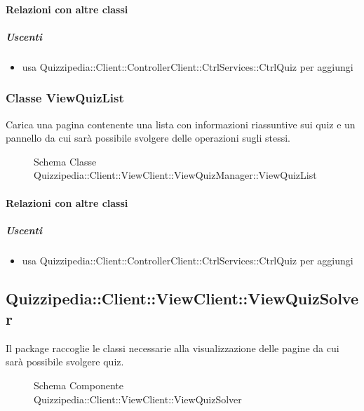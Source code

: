 \paragraph{Relazioni con altre classi}
\subparagraph{Uscenti}
\begin{itemize}
\item usa Quizzipedia::Client::ControllerClient::CtrlServices::CtrlQuiz per aggiungi
\end{itemize}
\subsubsection{Classe ViewQuizList}
Carica una pagina contenente una lista con informazioni riassuntive sui quiz e un pannello da cui sarà possibile svolgere delle operazioni sugli stessi.
\begin{figure}[H]
\centering
\noindent{}
\caption[Schema Classe ViewQuizList]{Schema Classe Quizzipedia::Client::ViewClient::ViewQuizManager::ViewQuizList}
\end{figure}
\paragraph{Relazioni con altre classi}
\subparagraph{Uscenti}
\begin{itemize}
\item usa Quizzipedia::Client::ControllerClient::CtrlServices::CtrlQuiz per aggiungi
\end{itemize}
\subsection{Quizzipedia::Client::ViewClient::ViewQuizSolver}
Il package raccoglie le classi necessarie alla visualizzazione delle pagine da cui sarà possibile svolgere quiz.
\begin{figure}[H]
\centering
\noindent{}
\caption[Schema Componente Quizzipedia::Client::ViewClient::ViewQuizSolver]{Schema Componente Quizzipedia::Client::ViewClient::ViewQuizSolver}
\end{figure}
